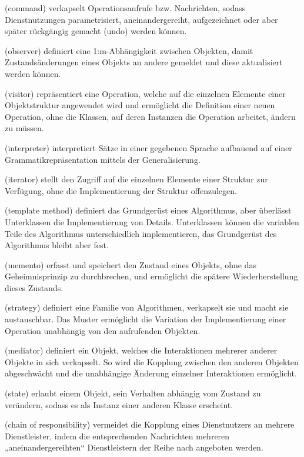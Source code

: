 \begin{description}
	\setlength{\itemsep}{2mm} %
	
	\item[\textit{Befehl}] (command) verkapselt Operationsaufrufe bzw. Nachrichten, sodass Dienstnutzungen parametrisiert, aneinandergereiht, aufgezeichnet oder aber später rückgängig gemacht (undo) werden können.
	\item[\textit{Beobachter}] (observer) definiert eine 1:m-Abhängigkeit zwischen Objekten, damit Zustandsänderungen eines Objekts an andere gemeldet und diese aktualisiert werden können.
	\item[\textit{Besucher}] (visitor) repräsentiert eine Operation, welche auf die einzelnen Elemente einer Objektstruktur angewendet wird und ermöglicht die Definition einer neuen Operation, ohne die Klassen, auf deren Instanzen die Operation arbeitet, ändern zu müssen.
	\item[\textit{Interpreter}] (interpreter) interpretiert Sätze in einer gegebenen Sprache aufbauend auf einer Grammatikrepräsentation mittels der Generalisierung.
	\item[\textit{Iterator}] (iterator) stellt den Zugriff auf die einzelnen Elemente einer Struktur zur Verfügung, ohne die Implementierung der Struktur offenzulegen.
	\item[\textit{Schablonenmethode}] (template method) definiert das Grundgerüst eines Algorithmus, aber überlässt Unterklassen die Implementierung von Details. Unter\-klassen können die variablen Teile des Algorithmus unterschiedlich implementieren, das Grundgerüst des Algorithmus bleibt aber fest.
	\item[\textit{Memento}] (memento) erfasst und speichert den Zustand eines Objekts, ohne das Geheimnisprinzip zu durchbrechen, und ermöglicht die spätere Wieder\-her\-stellung dieses Zustands.
	\item[\textit{Strategie}] (strategy) definiert eine Familie von Algorithmen, verkapselt sie und macht sie austauschbar. Das Muster ermöglicht die Variation der Implementierung einer Operation unabhängig von den aufrufenden Objekten.

\pagebreak %

	\item[\textit{Vermittler}] (mediator) definiert ein Objekt, welches die Interaktionen mehrerer anderer Objekte in sich verkapselt. So wird die Kopplung zwischen den anderen Objekten abgeschwächt und die unabhängige Änderung einzelner Inter\-aktionen ermöglicht.
	\item[\textit{Zustand}] (state) erlaubt einem Objekt, sein Verhalten abhängig vom Zustand zu verändern, sodass es als Instanz einer anderen Klasse erscheint.
	\item[\textit{Zuständigkeitskette}] (chain of responsibility) vermeidet die Kopplung eines Dienstnutzers an mehrere Dienstleister, indem die entsprechenden Nachrichten mehreren „aneinandergereihten“ Dienstleistern der Reihe nach angeboten werden.
\end{description}


